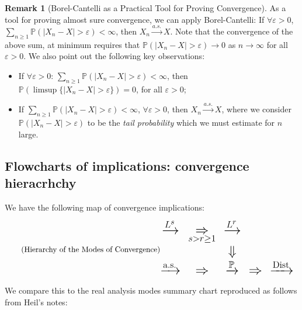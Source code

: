 \documentclass[12pt,reqno]{article}
\renewcommand{\emph}[1]{\textit{#1}}
\theoremstyle{plain}
\theoremstyle{definition}
\newtheorem{remark}[theorem]{Remark}
\newcommand{\PP}[1]{\ensuremath{\mathbb{P}\left(#1\right)}}
\begin{document}
\begin{remark}[Borel-Cantelli as a Practical Tool for Proving Convergence]
As a tool for proving almost sure convergence, we can apply 
Borel-Cantelli: If $\forall \varepsilon > 0$, 
$\sum_{n \geq 1} \mathbb{P}(|X_n-X| > \varepsilon) < \infty$, then 
$X_n \xrightarrow{a.s.} X$. Note that the convergence of the above sum, 
at minimum requires that 
$\mathbb{P}(|X_n-X| > \varepsilon) \rightarrow 0$ as $n \rightarrow \infty$ 
for all $\varepsilon > 0$. We also point out the following key observations:
\begin{itemize} 

\item If $\forall \varepsilon > 0$: $\sum_{n \geq 1} \PP{|X_n-X| > \varepsilon} < \infty$, 
     then $\PP{\limsup \{|X_n-X| > \varepsilon\}} = 0$, for all $\varepsilon > 0$; 
\item If $\sum_{n \geq 1} \PP{|X_n-X| > \varepsilon} < \infty$, $\forall \varepsilon > 0$, 
      then $X_n \xrightarrow{a.s.} X$, where we consider $\PP{|X_n-X| > \varepsilon}$ to be 
      the \emph{tail probability} which we must estimate for $n$ large. 

\end{itemize} 
\end{remark} 

\subsection{Flowcharts of implications: convergence hieracrhchy} 

We have the following map of convergence implications:
\begin{equation} 
\tag{Hierarchy of the Modes of Convergence} 
\mbox{\LARGE
$\begin{matrix}
  \xrightarrow{\overset{}{L^s}}  & \underset{s>r\geq1}{\Rightarrow} &  \xrightarrow{\overset{}{L^r}}  &             & \\
                                 &                                  &     \Downarrow                  &             & \\
  \xrightarrow{\text{a.s.}}      &            \Rightarrow           &  \xrightarrow{\mathbb{P}}                & 
  \Rightarrow & \xrightarrow{\operatorname{Dist}}
  \end{matrix}$
}
\end{equation} 
We compare this to the real analysis modes summary chart reproduced as follows from Heil's notes: 
\begin{center} 
\end{center} 
\end{document}
